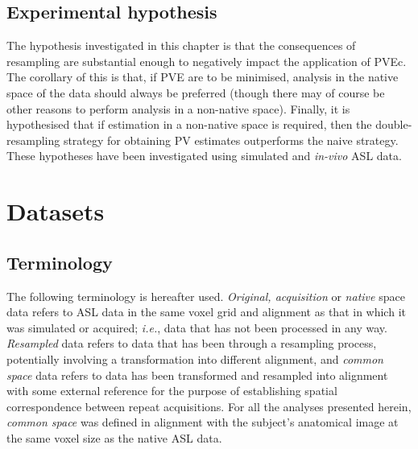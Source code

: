 \documentclass[12pt]{report}
\begin{document}
\subsection{Experimental hypothesis}
The hypothesis investigated in this chapter is that the consequences of resampling are substantial enough to negatively impact the application of PVEc. The corollary of this is that, if PVE are to be minimised, analysis in the native space of the data should always be preferred (though there may of course be other reasons to perform analysis in a non-native space). Finally, it is hypothesised that if estimation in a non-native space is required, then the double-resampling strategy for obtaining PV estimates outperforms the naive strategy. These hypotheses have been investigated using simulated and \textit{in-vivo} ASL data. 

\section{Datasets}

\subsection{Terminology}

The following terminology is hereafter used. \textit{Original, acquisition} or \textit{native} space data refers to ASL data in the same voxel grid and alignment as that in which it was simulated or acquired; \textit{i.e.}, data that has not been processed in any way. \textit{Resampled} data refers to data that has been through a resampling process, potentially involving a transformation into different alignment, and \textit{common space} data refers to data has been transformed and resampled into alignment with some external reference for the purpose of establishing spatial correspondence between repeat acquisitions. For all the analyses presented herein, \textit{common space} was defined in alignment with the subject's anatomical image at the same voxel size as the native ASL data. 
\end{document}
